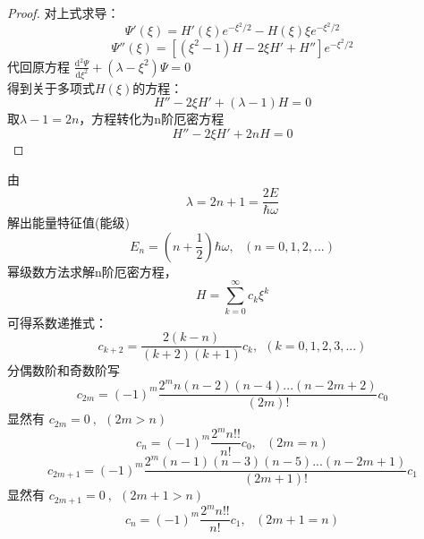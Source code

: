 \begin{proof}
对上式求导：\\
\begin{equation*}
	\Psi'(\xi) = H'(\xi) e^{-\xi^2/2 } -  H(\xi) \xi e^{-\xi^2/2 } 
\end{equation*}  
\begin{equation*}
	\Psi''(\xi) = \left[  \left( \xi^2 -1 \right) H -2\xi H' +H''  \right] e^{-\xi^2/2}
\end{equation*}  
代回原方程  {\large $ \displaystyle \frac{\mathrm{d} ^2\Psi}{\mathrm{d} \xi^2} + \left( \lambda - \xi^2 \right) \Psi=0 $  }  \\ 
得到关于多项式$H(\xi)$的方程： \\  
\begin{equation*}
H'' -2 \xi H' +(\lambda -1) H=0 
\end{equation*}  
取$\lambda -1= 2n $，方程转化为n阶厄密方程
\begin{equation*}
	H'' -2 \xi H' +2n H=0 
\end{equation*}  
\end{proof}	
由
\begin{equation*}
\lambda = 2n +1 = \frac{2E}{\hbar  \omega}  
\end{equation*}  
解出能量特征值(能级)
\begin{equation*}
E_n=\left(n+\frac{1}{2}\right) \hbar \omega, ~~~  ( n=0,1,2, ...)  
\end{equation*}  
幂级数方法求解n阶厄密方程，
\begin{equation*}
	H=\sum_{k=0}^{\infty} c_k \xi ^k
\end{equation*}     
可得系数递推式：
\begin{equation*}
	c_{k+2} = \frac{ 2(k-n)}{(k+2)(k+1) } c_k, ~~  \left( k=0,1,2,3, ...  \right)
\end{equation*}   
分偶数阶和奇数阶写
\begin{equation*}
 c_{2m} = (-1) ^m \frac{2^mn(n-2)(n-4) ... (n-2m+2)  } {(2m)!} c_0
\end{equation*}   
显然有 $ c_{2m} =0~, ~~(2m>n)$
\begin{equation*}
c_{n} = (-1) ^m \frac{2^mn !! } {n!} c_0, ~~~(2m=n)
\end{equation*}   
\begin{equation*}
c_{2m+1} = (-1) ^m \frac{2^m (n-1) (n-3)(n-5)...(n-2m+1)  } {(2m+1)!} c_1
\end{equation*}   
显然有 $ c_{2m+1} =0~, ~~(2m+1>n)$
\begin{equation*}
	c_{n} = (-1) ^m \frac{2^m n!! }{n!} c_1, ~~~ (2m+1=n)
	\end{equation*}  
